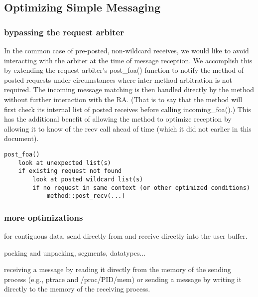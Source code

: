 
\subsection{Optimizing Simple Messaging}


\subsubsection{bypassing the request arbiter}

In the common case of pre-posted, non-wildcard receives, we would like to avoid
interacting with the arbiter at the time of message reception.  We accomplish
this by extending the request arbiter's post_foa() function to notify the
method of posted requests under circumstances where inter-method arbitration is
not required.  The incoming message matching is then handled directly by the
method without further interaction with the RA.  (That is to say that the
method will first check its internal list of posted receives before calling
incoming_foa().)  This has the additional benefit of allowing the method to
optimize reception by allowing it to know of the recv call ahead of time (which
it did not earlier in this document).

\begin{verbatim}
post_foa()
    look at unexpected list(s)
    if existing request not found
        look at posted wildcard list(s)
        if no request in same context (or other optimized conditions)
            method::post_recv(...)
\end{verbatim}


\subsubsection{more optimizations}

for contiguous data, send directly from and receive directly into the
user buffer.

packing and unpacking, segments, datatypes...

receiving a message by reading it directly from the memory of the
sending process (e.g., ptrace and /proc/PID/mem) or sending a message
by writing it directly to the memory of the receiving process.

